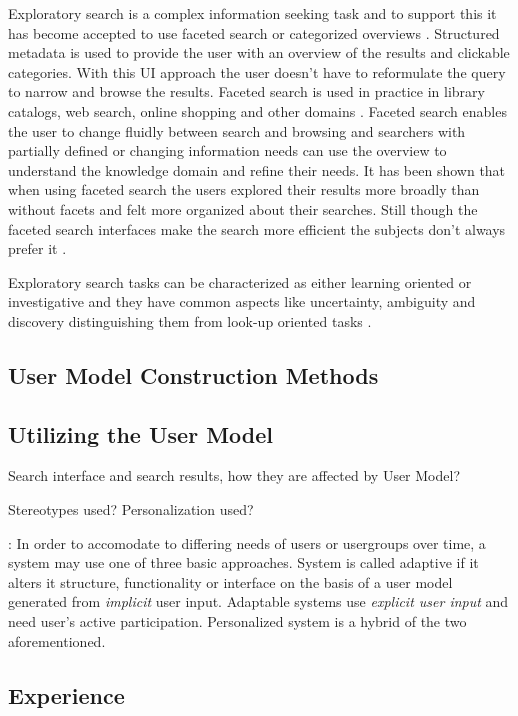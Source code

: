 \documentclass{sigchi}
\begin{document}
Exploratory search is a complex information seeking task and to support this it has become accepted to use faceted search or categorized overviews \cite{kules09}. Structured metadata is used to provide the user with an overview of the results and clickable categories. With this UI approach the user doesn't have to reformulate the query to narrow and browse the results. Faceted search is used in practice in library catalogs, web search, online shopping and other domains \cite{kules09}. Faceted search enables the user to change fluidly between search and browsing and searchers with partially defined or changing information needs can use the overview to understand the knowledge domain and refine their needs. It has been shown that when using faceted search the users explored their results more broadly than without facets and felt more organized about their searches. Still though the faceted search interfaces make the search more efficient the subjects don't always prefer it \cite{kules09}. 

Exploratory search tasks can be characterized as either learning oriented or investigative  and they have common aspects like uncertainty, ambiguity and discovery distinguishing them from look-up oriented tasks \cite{kules09}.

\subsection{User Model Construction Methods}

\subsection{Utilizing the User Model}

Search interface and search results, how they are affected by User Model?

Stereotypes used? Personalization used?

\cite{van08}: 
In order to accomodate to differing needs of users or usergroups over time, a system may use one of three basic approaches. System is called adaptive if it alters it structure, functionality or interface on the basis of a user model generated from \textit{implicit} user input. Adaptable systems use \textit{explicit user input} and need user's active participation. Personalized system is a hybrid of the two aforementioned.

\subsection{Experience}
\end{document}
